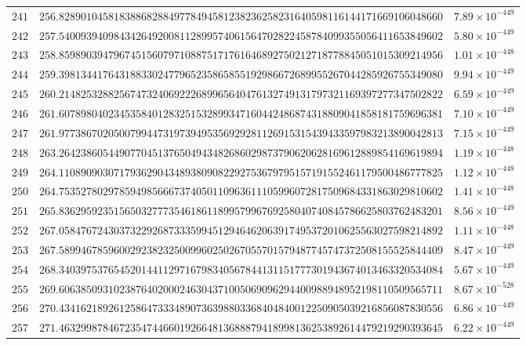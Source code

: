\documentclass[12pt,reqno]{amsart}
\theoremstyle{remark}
\begin{document}
\begin{longtable}{clc}
$241$ & $256.8289010458183886828849778494581238236258231640598116144171669106048660$ & $7.89\times 10^{-449}$ \\
$242$ & $257.5400939409843426492008112899574061564702822458784099355056411653849602$ & $5.80\times 10^{-449}$ \\
$243$ & $258.8598903947967451560797108875171761646892750212718778845051015309214956$ & $1.01\times 10^{-448}$ \\
$244$ & $259.3981344176431883302477965235865855192986672689955267044285926755349080$ & $9.94\times 10^{-449}$ \\
$245$ & $260.2148253288256747324069222689965640476132749131797321169397277347502822$ & $6.59\times 10^{-449}$ \\
$246$ & $261.6078980402345358401283251532899347160442486874318809041858181759696381$ & $7.10\times 10^{-449}$ \\
$247$ & $261.9773867020500799447319739495356929281126915315439433597983213890042813$ & $7.15\times 10^{-449}$ \\
$248$ & $263.2642386054490770451376504943482686029873790620628169612889854169619894$ & $1.19\times 10^{-448}$ \\
$249$ & $264.1108909030717936290434893809082292753679795157191552461179500486777825$ & $1.12\times 10^{-448}$ \\
$250$ & $264.7535278029785949856667374050110963611105996072817509684331863029810602$ & $1.41\times 10^{-448}$ \\
$251$ & $265.8362959235156503277735461861189957996769258040740845786625803762483201$ & $8.56\times 10^{-449}$ \\
$252$ & $267.0584767243037322926873335994512946462063917495372010625563027598214892$ & $1.11\times 10^{-448}$ \\
$253$ & $267.5899467859600292382325009960250267055701579487745747372508155525844409$ & $8.47\times 10^{-449}$ \\
$254$ & $268.3403975376545201441129716798340567844131151777301943674013463320534084$ & $5.67\times 10^{-449}$ \\
$255$ & $269.6063850931023876402000246304371005069096294400988948952198110509565711$ & $8.67\times 10^{-528}$ \\
$256$ & $270.4341621892612586473334890736398803368404840012250905039216856087830556$ & $6.86\times 10^{-449}$ \\
$257$ & $271.4632998784672354744660192664813688879418998136253892614479219290393645$ & $6.22\times 10^{-449}$ \\

\end{longtable}
\end{document}
